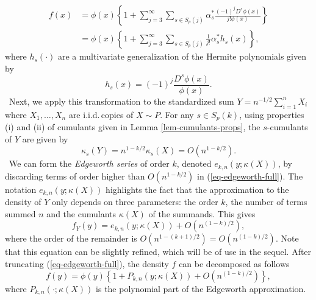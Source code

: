 \begin{align}
    f(x) 
    &= \phi(x) \left\{ 1 + \sum_{j=3}^\infty 
    \sum_{s \in S_p(j)}
    \alpha^*_s \frac{(-1)^j D^s \phi(x)}{j! \phi(x)}\right\} \nonumber \\
    &= \phi(x) \left\{
        1 + \sum_{j=3}^\infty  \sum_{s \in S_p(j)} \frac{1}{j!}\alpha^*_s h_s(x)
    \right\}, \label{eq-edgeworth-full}
\end{align} 
where $h_s(\cdot)$ are a multivariate generalization of the Hermite polynomials given by
\begin{equation*}
    h_s(x) = (-1)^j \frac{D^s \phi(x)}{\phi(x)}.
\end{equation*}
\
Next, we apply this transformation to the standardized sum $Y = n^{-1/2}\sum_{i=1}^n X_i$ where $X_1, \ldots, X_n$ are i.i.d.\,copies of $X \sim P$. For any $s \in S_p(k)$, using properties (i) and (ii) of cumulants given in Lemma \ref{lem-cumulants-props}, the $s$-cumulants of $Y$ are given by 
\begin{equation*}
    \kappa_s(Y) = n^{1-k/2} \kappa_s(X) = O(n^{1-k/2}).
\end{equation*}
\
We can form the \textit{Edgeworth series} of order $k$, denoted $e_{k, n}(y; \kappa(X))$, by discarding terms of order higher than $O(n^{1-k/2})$ in (\ref{eq-edgeworth-full}). The notation $e_{k, n}(y; \kappa(X))$ highlights the fact that the approximation to the density of $Y$ only depends on three parameters: the order $k$, the number of terms summed $n$ and the cumulants $\kappa(X)$ of the summands. This gives
\begin{equation} \label{eq-edgeworth}
    f_Y(y) = e_{k, n}(y; \kappa(X)) + O(n^{(1-k)/2}),
\end{equation}
where the order of the remainder is $O(n^{1-(k+1)/2}) = O(n^{(1-k)/2})$. Note that this equation can be slightly refined, which will be of use in the sequel. After truncating (\ref{eq-edgeworth-full}), the density $f$ can be decomposed as follows
\begin{equation} \label{eq-edge-polynomial}
    f(y) = \phi(y)\left\{1 + P_{k, n}(y; \kappa(X)) + O(n^{(1-k)/2})\right\},
\end{equation}
where $P_{k, n}(\cdot; \kappa(X))$ is the polynomial part of the Edgeworth approximation.

